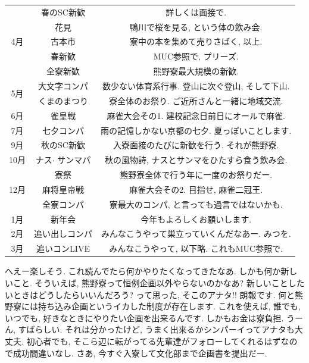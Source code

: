 \documentclass[10pt,b5jsbook,dvips,dvipdfmx,openany]{jsbook}
\theoremstyle{definition}
\begin{document}
\begin{table}[htb]
  \begin{tabular}{|c||c|c|} \hline
	\multirow{5}{*}{4月}	& 春のSC新歓		& 詳しくは面接で.   \\ 
    						& 花見			& 鴨川で桜を見る, という体の飲み会.  \\
      						& 古本市			& 寮中の本を集めて売りさばく, 以上. \\ 
    	  					& 春新歓			& MUC参照で, プリーズ.   \\  %
      						& 全寮新歓		& 熊野寮最大規模の新歓.  \\ \hline
	\multirow{2}{*}{5月}	& 大文字コンパ	& 数少ない体育系行事. 登山に次ぐ登山, そして下山.  \\
						& くまのまつり	& 寮全体のお祭り. ご近所さんと一緒に地域交流.  \\ \hline 
			6月			& 雀皇戦			& 麻雀大会その1. 建校記念日前日にオールで麻雀.  \\ \hline
			7月			& 七夕コンパ		& 雨の記憶しかない京都の七夕. 夏っぽいことします.  \\ \hline
			9月			& 秋のSC新歓		& 入寮面接のたびに新歓を行う. それが熊野寮.  \\ \hline
			10月			& ナス$ \cdot $ サンマパ	& 秋の風物詩, ナスとサンマをひたすら食う飲み会.  \\ \hline
	\multirow{3}{*}{12月}	& 寮祭			& 熊野寮全体で行う年に一度のお祭りだー.  \\
						& 麻将皇帝戦		& 麻雀大会その2. 目指せ, 麻雀二冠王. \\
						& 全寮コンパ		& 寮最大のコンパ, と言っても過言ではないかも.  \\ \hline
			1月			& 新年会			& 今年もよろしくお願いします. \\ \hline
			2月			& 追い出しコンパ	& みんなこうやって巣立っていくんだなあー. みつを.  \\ \hline
			3月			& 追いコンLIVE	& みんなこうやって, 以下略. これもMUC参照で.  \\ \hline
  \end{tabular}
\end{table}

 		へえー楽しそう. これ読んでたら何かやりたくなってきたなあ. しかも何か新しいこと. そういえば, 熊野寮って恒例企画以外やらないのかなあ?  新しいことしたいときはどうしたらいいんだろう?  って思った, そこのアナタ!!  朗報です. 何と熊野寮には持ち込み企画というイカした制度が存在します. これを使えば, 誰でも, いつでも, 好きなときにやりたい企画を出来るんです. しかもお金は寮負担. うーん, すばらしい. それは分かったけど, うまく出来るかシンパーイってアナタも大丈夫. 初心者でも, そこら辺に転がってる先輩達がフォローしてくれるはずなので成功間違いなし. さあ, 今すぐ入寮して文化部まで企画書を提出だー. 
		
\end{document}
